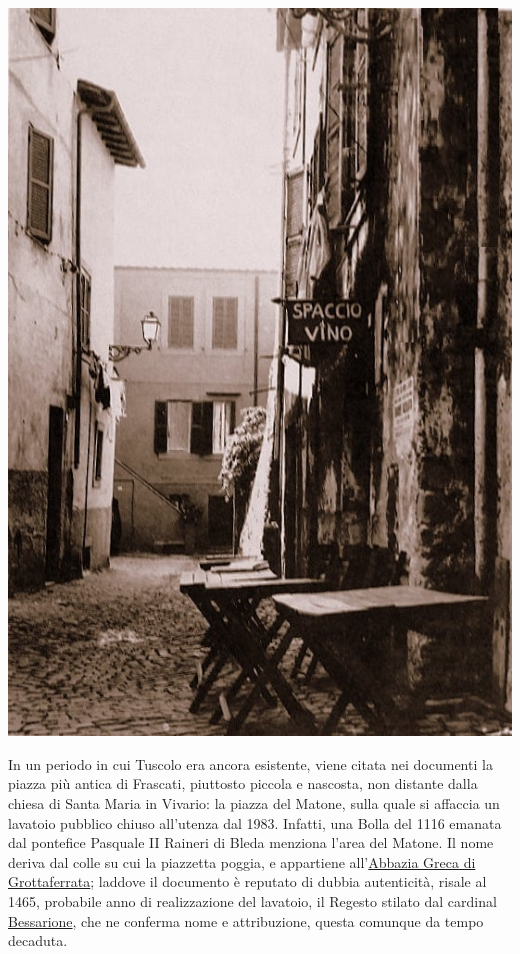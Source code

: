 \documentclass[
  letterpaper,
  DIV=11,
  numbers=noendperiod]{scrartcl}
\begin{document}
\begin{center}
\includegraphics{../../images/2024/san_rocco/2matone.jpg}
\end{center}
In un periodo in cui Tuscolo era ancora esistente, viene citata nei
documenti la piazza più antica di Frascati, piuttosto piccola e
nascosta, non distante dalla chiesa di Santa Maria in Vivario: la piazza
del Matone, sulla quale si affaccia un lavatoio pubblico chiuso
all'utenza dal 1983. Infatti, una Bolla del 1116 emanata dal pontefice
Pasquale II Raineri di Bleda menziona l'area del Matone. Il nome deriva
dal colle su cui la piazzetta poggia, e appartiene
all'\href{2016-12-31-momenti-fine-comandini.html\#parus\%C3\%ACa-unica-via}{Abbazia
Greca di Grottaferrata}; laddove il documento è reputato di dubbia
autenticità, risale al 1465, probabile anno di realizzazione del
lavatoio, il Regesto stilato dal cardinal
\href{2014-04-29-strade-fener-comandini.html\#partire}{Bessarione}, che
ne conferma nome e attribuzione, questa comunque da tempo decaduta.
\end{document}
